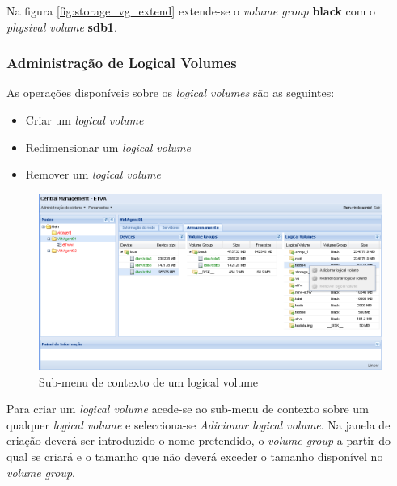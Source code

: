 Na figura \ref{fig:storage_vg_extend} extende-se o \emph{volume group} {\bf black} com o \emph{physival volume} {\bf sdb1}.


\subsubsection{Administração de Logical Volumes}

As operações disponíveis sobre os \emph{logical volumes} são as seguintes:
\begin{itemize}
	\item Criar um \emph{logical volume}
	\item Redimensionar um \emph{logical volume}
	\item Remover um \emph{logical volume}
\end{itemize}

\begin{figure}[H]
        \begin{center}
        \includegraphics[scale=0.45]{screenshots/node_storage_lv_ctx.png}
        \caption{Sub-menu de contexto de um logical volume}
        \label{fig:storage_lv_ctx}
        \end{center}
\end{figure}

Para criar um \emph{logical volume} acede-se ao sub-menu de contexto sobre um qualquer \emph{logical volume} e selecciona-se \emph{Adicionar logical volume}.
Na janela de criação deverá ser introduzido o nome pretendido, o \emph{volume group} a partir do qual se criará e o tamanho que não deverá exceder o tamanho disponível no \emph{volume group}.

